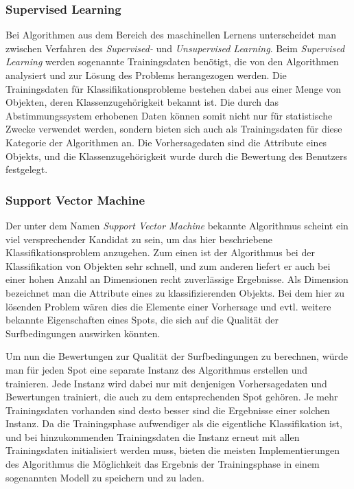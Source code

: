 \subsubsection{Supervised Learning}
Bei Algorithmen aus dem Bereich des maschinellen Lernens unterscheidet
man zwischen Verfahren des \textit{Supervised-} und
\textit{Unsupervised Learning}. Beim \textit{Supervised Learning}
werden sogenannte Trainingsdaten benötigt, die von den Algorithmen
analysiert und zur Lösung des Problems herangezogen werden. Die
Trainingsdaten für Klassifikationsprobleme bestehen dabei aus einer
Menge von Objekten, deren Klassenzugehörigkeit bekannt ist. Die durch
das Abstimmungssystem erhobenen Daten können somit nicht nur für
statistische Zwecke verwendet werden, sondern bieten sich auch als
Trainingsdaten für diese Kategorie der Algorithmen an. Die
Vorhersagedaten sind die Attribute eines Objekts, und die
Klassenzugehörigkeit wurde durch die Bewertung des Benutzers
festgelegt.

\subsubsection{Support Vector Machine}
Der unter dem Namen \textit{Support Vector Machine} bekannte
Algorithmus scheint ein viel versprechender Kandidat zu sein, um das
hier beschriebene Klassifikationsproblem anzugehen. Zum einen ist der
Algorithmus bei der Klassifikation von Objekten sehr schnell, und zum
anderen liefert er auch bei einer hohen Anzahl an Dimensionen recht
zuverlässige Ergebnisse. Als Dimension bezeichnet man die Attribute
eines zu klassifizierenden Objekts. Bei dem hier zu lösenden Problem
wären dies die Elemente einer Vorhersage und evtl. weitere bekannte
Eigenschaften eines Spots, die sich auf die Qualität der
Surfbedingungen auswirken könnten.

Um nun die Bewertungen zur Qualität der Surfbedingungen zu berechnen,
würde man für jeden Spot eine separate Instanz des Algorithmus
erstellen und trainieren. Jede Instanz wird dabei nur mit denjenigen
Vorhersagedaten und Bewertungen trainiert, die auch zu dem
entsprechenden Spot gehören. Je mehr Trainingsdaten vorhanden sind
desto besser sind die Ergebnisse einer solchen Instanz. Da die
Trainingsphase aufwendiger als die eigentliche Klassifikation ist, und
bei hinzukommenden Trainingsdaten die Instanz erneut mit allen
Trainingsdaten initialisiert werden muss, bieten die meisten
Implementierungen des Algorithmus die Möglichkeit das Ergebnis der
Trainingsphase in einem sogenannten Modell zu speichern und zu laden.

